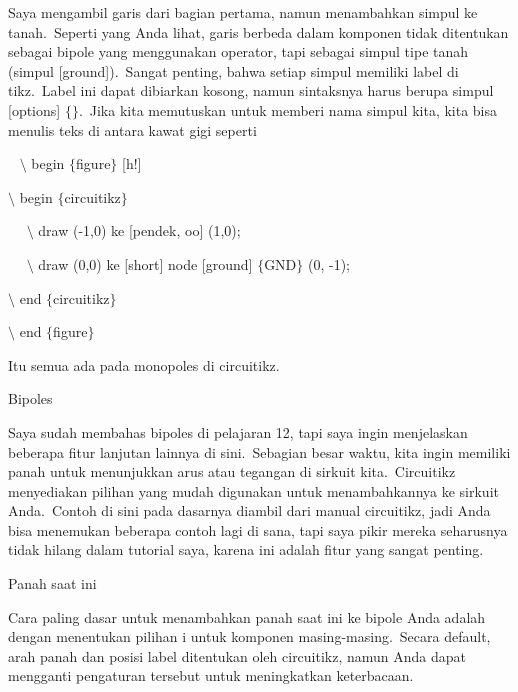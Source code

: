 \noindent 
Saya mengambil garis dari bagian pertama, namun menambahkan simpul ke tanah. Seperti yang Anda lihat, garis berbeda dalam komponen tidak ditentukan sebagai bipole yang menggunakan operator, tapi sebagai simpul tipe tanah (simpul [ground]). Sangat penting, bahwa setiap simpul memiliki label di tikz. Label ini dapat dibiarkan kosong, namun sintaksnya harus berupa simpul [options] $ \{ $$ \} $. Jika kita memutuskan untuk memberi nama simpul kita, kita bisa menulis teks di antara kawat gigi seperti
\par


\noindent 
~ $\setminus$ begin $ \{ $figure$ \} $ [h!]
\par


\noindent 
 $\setminus$ begin $ \{ $circuitikz$ \} $
\par


\noindent 
~~ $\setminus$ draw (-1,0) ke [pendek, oo] (1,0);
\par


\noindent 
~~ $\setminus$ draw (0,0) ke [short] node [ground] $ \{ $GND$ \} $ (0, -1);
\par


\noindent 
 $\setminus$ end $ \{ $circuitikz$ \} $
\par


\noindent 
 $\setminus$ end $ \{ $figure$ \} $ 
\par


\noindent 
Itu semua ada pada monopoles di circuitikz.
\par


\noindent 
Bipoles
\par


\noindent 
Saya sudah membahas bipoles di pelajaran 12, tapi saya ingin menjelaskan beberapa fitur lanjutan lainnya di sini. Sebagian besar waktu, kita ingin memiliki panah untuk menunjukkan arus atau tegangan di sirkuit kita. Circuitikz menyediakan pilihan yang mudah digunakan untuk menambahkannya ke sirkuit Anda. Contoh di sini pada dasarnya diambil dari manual circuitikz, jadi Anda bisa menemukan beberapa contoh lagi di sana, tapi saya pikir mereka seharusnya tidak hilang dalam tutorial saya, karena ini adalah fitur yang sangat penting.
\par


\noindent 
Panah saat ini
\par


\noindent 
Cara paling dasar untuk menambahkan panah saat ini ke bipole Anda adalah dengan menentukan pilihan i untuk komponen masing-masing. Secara default, arah panah dan posisi label ditentukan oleh circuitikz, namun Anda dapat mengganti pengaturan tersebut untuk meningkatkan keterbacaan.
\par


